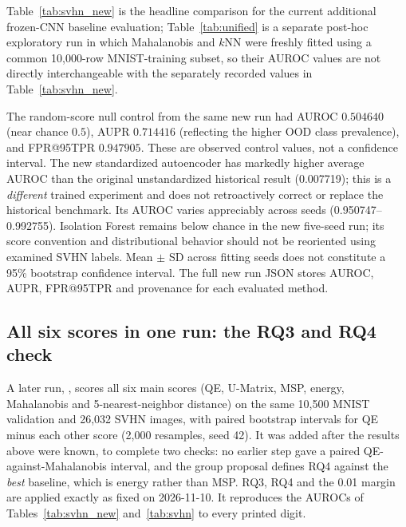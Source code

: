 \documentclass[11pt]{article}
\begin{document}
Table~\ref{tab:svhn_new} is the headline comparison for the current additional frozen-CNN baseline evaluation; Table~\ref{tab:unified} is a separate post-hoc exploratory run in which Mahalanobis and $k$NN were freshly fitted using a common 10,000-row MNIST-training subset, so their AUROC values are not directly interchangeable with the separately recorded values in Table~\ref{tab:svhn_new}.

The random-score null control from the same new run had AUROC $0.504640$ (near chance $0.5$), AUPR $0.714416$ (reflecting the higher OOD class prevalence), and FPR@95TPR $0.947905$. These are observed control values, not a confidence interval. The new standardized autoencoder has markedly higher average AUROC than the original unstandardized historical result (0.007719); this is a \emph{different} trained experiment and does not retroactively correct or replace the historical benchmark. Its AUROC varies appreciably across seeds (0.950747--0.992755). Isolation Forest remains below chance in the new five-seed run; its score convention and distributional behavior should not be reoriented using examined SVHN labels. Mean $\pm$ SD across fitting seeds does not constitute a 95\% bootstrap confidence interval. The full new run JSON stores AUROC, AUPR, FPR@95TPR and provenance for each evaluated method.

\subsection{All six scores in one run: the RQ3 and RQ4 check}
A later run, , scores all six main scores (QE, U-Matrix, MSP, energy, Mahalanobis and 5-nearest-neighbor distance) on the same 10,500 MNIST validation and 26,032 SVHN images, with paired bootstrap intervals for QE minus each other score (2,000 resamples, seed 42). It was added after the results above were known, to complete two checks: no earlier step gave a paired QE-against-Mahalanobis interval, and the group proposal defines RQ4 against the \emph{best} baseline, which is energy rather than MSP. RQ3, RQ4 and the 0.01 margin are applied exactly as fixed on 2026-11-10. It reproduces the AUROCs of Tables~\ref{tab:svhn_new} and~\ref{tab:svhn} to every printed digit.
\end{document}
